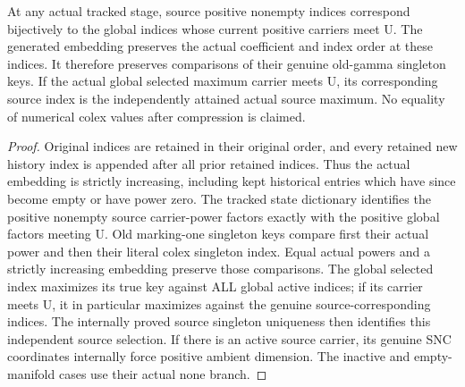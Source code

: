 \begin{lemma}
\label{hir:nc-ordered-open-trace-singleton-order}
\leanok
{}
At any actual tracked stage, source positive nonempty indices correspond
bijectively to the global indices whose current positive carriers meet U.
The generated embedding preserves the actual coefficient and index order at
these indices. It therefore preserves comparisons of their genuine old-gamma
singleton keys. If the actual global selected maximum carrier meets U, its
corresponding source index is the independently attained actual source maximum.
No equality of numerical colex values after compression is claimed.
\end{lemma}
\begin{proof}
Original indices are retained in their original order, and every retained new
history index is appended after all prior retained indices. Thus the actual
embedding is strictly increasing, including kept historical entries which
have since become empty or have power zero. The tracked state dictionary
identifies the positive nonempty source carrier-power factors exactly with
the positive global factors meeting U. Old marking-one singleton keys compare
first their actual power and then their literal colex singleton index. Equal
actual powers and a strictly increasing embedding preserve those comparisons.
The global selected index maximizes its true key against ALL global active
indices; if its carrier meets U, it in particular maximizes against the genuine
source-corresponding indices. The internally proved source singleton uniqueness
then identifies this independent source selection. If there is an active source
carrier, its genuine SNC coordinates internally force positive ambient dimension.
The inactive and empty-manifold cases use their actual none branch.
\end{proof}

